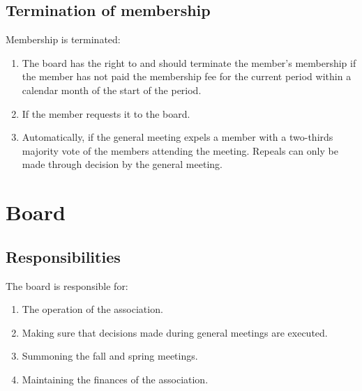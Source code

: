 \subsection{Termination of membership} \label{sec:membershipTermination}
Membership is terminated:
\begin{enumerate}
  \item The board has the right to and should terminate the member's membership if the member has not paid the membership fee for the current period
  within a calendar month of the start of the period.
  \item If the member requests it to the board.
  \item Automatically, if the general meeting expels a member with a two-thirds majority vote of the members attending the meeting.
  Repeals can only be made through decision by the general meeting.
\end{enumerate}

\section*{Board}
\subsection{Responsibilities}
The board is responsible for:
\begin{enumerate}
  \item The operation of the association.
  \item Making sure that decisions made during general meetings are executed.
  \item Summoning the fall and spring meetings. 
  \item Maintaining the finances of the association. 
\end{enumerate}

